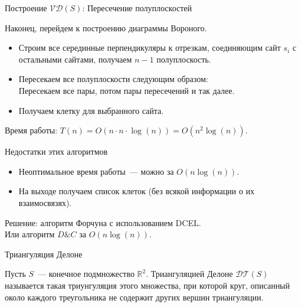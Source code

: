 \documentclass[12pt,aspectratio=169,svgnames]{beamer}
\begin{document}
    \begin{frame}{Построение $\mathcal{V}\mathcal{D}(S)$: Пересечение полуплоскостей}

        Наконец, перейдем к построению диаграммы Вороного.

        \begin{itemize}

            \item Строим все серединные перпендикуляры к отрезкам, соединяющим сайт $s_i$ с остальными сайтами, получаем $n - 1$ полуплоскость.

            \item Пересекаем все полуплоскости следующим образом: \\
                  Пересекаем все пары, потом пары пересечений и так далее.

            \item Получаем клетку для выбранного сайта.

        \end{itemize}

        Время работы: $T(n) = O(n \cdot n \cdot \log(n)) = O(n^2 \log(n))$.

    \end{frame}

    \begin{frame}{Недостатки этих алгоритмов}

        \begin{itemize}

            \item Неоптимальное время работы~--- можно за  $O(n \log(n))$.

            \item На выходе получаем список клеток (без всякой информации о их взаимосвязях).

        \end{itemize}

        Решение: алгоритм Форчуна с использованием DCEL.\\

        Или алгоритм $D\&C$ за $O(n\log(n))$.

    \end{frame}

    \begin{frame}{Триангуляция Делоне}

        \begin{defn}

            Пусть $S$~--- конечное подмножество $\mathbb{R}^2$.
            Триангуляцией Делоне  $\mathcal{D}\mathcal{T}(S)$  называется такая триунгуляция этого множества,
            при которой круг, описанный около каждого треугольника не содержит других вершин триангуляции.

        \end{defn}

    \end{frame}
\end{document}
